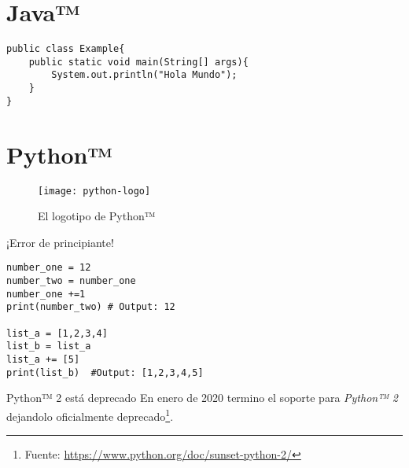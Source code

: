 \section{Java™}

\lipsum[2-3]

\begin{lstlisting}[frame=single]
public class Example{
    public static void main(String[] args){
        System.out.println("Hola Mundo");
    }
}
\end{lstlisting}

\lipsum[1-2]

\section{Python™}

\lipsum[1-2]

\begin{figure}[H]
    \centering
    \texttt{[image: python-logo]}
    \caption{El logotipo de Python™}
    \label{fig_1}
\end{figure}

\lipsum[2-3]

\separation
\begin{alertblock}{¡Error de principiante!}
    \begin{lstlisting}[frame=single]
number_one = 12
number_two = number_one
number_one +=1
print(number_two) # Output: 12

list_a = [1,2,3,4]
list_b = list_a
list_a += [5]
print(list_b)  #Output: [1,2,3,4,5]

    \end{lstlisting}
\end{alertblock}

\separation
\lipsum[2-3]

\separation
\begin{infoblock}{Python™ 2 está deprecado}
En enero de 2020 termino el soporte para \textit{Python™ 2} dejandolo oficialmente deprecado\footnote{Fuente: \href{https://www.python.org/doc/sunset-python-2/}{https://www.python.org/doc/sunset-python-2/}}.
\end{infoblock}

